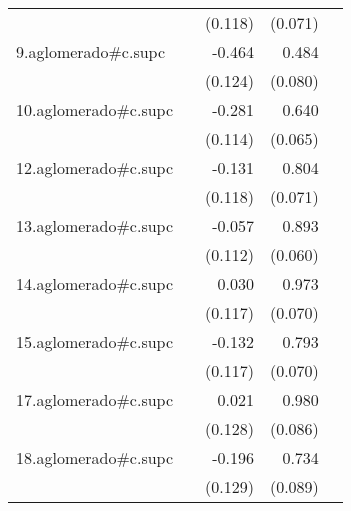 {\begin{longtable}{l*{4}{D{.}{.}{-1}}}
            &                     &     (0.118)         &     (0.071)         &                     \\
\addlinespace
9.aglomerado#c.supc&                     &      -0.464\sym{***}&       0.484\sym{***}&                     \\
            &                     &     (0.124)         &     (0.080)         &                     \\
\addlinespace
10.aglomerado#c.supc&                     &      -0.281\sym{*}  &       0.640\sym{***}&                     \\
            &                     &     (0.114)         &     (0.065)         &                     \\
\addlinespace
12.aglomerado#c.supc&                     &      -0.131         &       0.804\sym{***}&                     \\
            &                     &     (0.118)         &     (0.071)         &                     \\
\addlinespace
13.aglomerado#c.supc&                     &      -0.057         &       0.893\sym{***}&                     \\
            &                     &     (0.112)         &     (0.060)         &                     \\
\addlinespace
14.aglomerado#c.supc&                     &       0.030         &       0.973\sym{***}&                     \\
            &                     &     (0.117)         &     (0.070)         &                     \\
\addlinespace
15.aglomerado#c.supc&                     &      -0.132         &       0.793\sym{***}&                     \\
            &                     &     (0.117)         &     (0.070)         &                     \\
\addlinespace
17.aglomerado#c.supc&                     &       0.021         &       0.980\sym{***}&                     \\
            &                     &     (0.128)         &     (0.086)         &                     \\
\addlinespace
18.aglomerado#c.supc&                     &      -0.196         &       0.734\sym{***}&                     \\
            &                     &     (0.129)         &     (0.089)         &                     \\

\end{longtable}}
